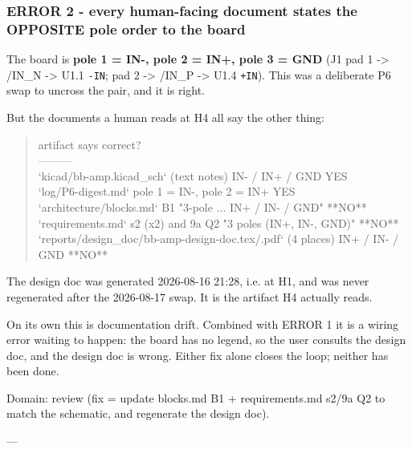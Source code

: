 \documentclass[11pt,a4paper]{article}
\begin{document}
\subsubsection*{ERROR 2 - every human-facing document states the OPPOSITE pole order to the board}
The board is \textbf{pole 1 = IN-, pole 2 = IN+, pole 3 = GND} (J1 pad 1 -\textgreater{} /IN\_N -\textgreater{} U1.1 \texttt{-IN}; pad 2 -\textgreater{} /IN\_P -\textgreater{} U1.4 \texttt{+IN}). This was a deliberate P6 swap to uncross the pair, and it is right.

But the documents a human reads at H4 all say the other thing:

\begin{quote}\small\ttfamily\raggedright
\textbar{} artifact \textbar{} says \textbar{} correct? \textbar{}\\
\textbar{}---\textbar{}---\textbar{}---\textbar{}\\
\textbar{} `kicad/bb-amp.kicad\_sch` (text notes) \textbar{} IN- / IN+ / GND \textbar{} YES \textbar{}\\
\textbar{} `log/P6-digest.md` \textbar{} pole 1 = IN-, pole 2 = IN+ \textbar{} YES \textbar{}\\
\textbar{} `architecture/blocks.md` B1 \textbar{} "3-pole ... IN+ / IN- / GND" \textbar{} {*}{*}NO{*}{*} \textbar{}\\
\textbar{} `requirements.md` s2 (x2) and 9a Q2 \textbar{} "3 poles (IN+, IN-, GND)" \textbar{} {*}{*}NO{*}{*} \textbar{}\\
\textbar{} `reports/design\_doc/bb-amp-design-doc.tex/.pdf` (4 places) \textbar{} IN+ / IN- / GND \textbar{} {*}{*}NO{*}{*} \textbar{}
\end{quote}
The design doc was generated 2026-08-16 21:28, i.e. at H1, and was never regenerated after the 2026-08-17 swap. It is the artifact H4 actually reads.

On its own this is documentation drift. Combined with ERROR 1 it is a wiring error waiting to happen: the board has no legend, so the user consults the design doc, and the design doc is wrong. Either fix alone closes the loop; neither has been done.

Domain: review (fix = update blocks.md B1 + requirements.md s2/9a Q2 to match the schematic, and regenerate the design doc).

---
\end{document}
